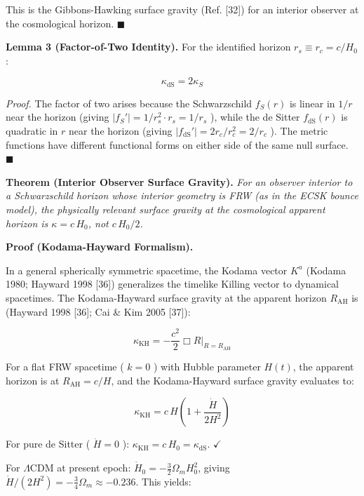 \documentclass[11pt,a4paper]{article}
\theoremstyle{definition}\newtheorem{definition}{Definition}
\theoremstyle{remark}\newtheorem{remark}{Remark}
\begin{document}
This is the Gibbons-Hawking surface gravity (Ref. [32]) for an interior observer at the cosmological horizon. $\blacksquare$

\textbf{Lemma 3 (Factor-of-Two Identity).} For the identified horizon $r_s \equiv r_c = c/H_0$:


\begin{equation}
\kappa_{\text{dS}} = 2 \kappa_S
\end{equation}


\textit{Proof.} The factor of two arises because the Schwarzschild $f_S(r)$ is linear in $1/r$ near the horizon (giving $|f_S'| = 1/r_s^2 \cdot r_s = 1/r_s$ ), while the de Sitter $f_{\text{dS}}(r)$ is quadratic in $r$ near the horizon (giving $|f_{\text{dS}}'| = 2r_c/r_c^2 = 2/r_c$ ). The metric functions have different functional forms on either side of the same null surface. $\blacksquare$

\textbf{Theorem (Interior Observer Surface Gravity).} \textit{For an observer interior to a Schwarzschild horizon whose interior geometry is FRW (as in the ECSK bounce model), the physically relevant surface gravity at the cosmological apparent horizon is $\kappa = c \, H_0$, not $c \, H_0/2$.}

\textbf{Proof (Kodama-Hayward Formalism).}

In a general spherically symmetric spacetime, the Kodama vector $K^a$ (Kodama 1980; Hayward 1998 [36]) generalizes the timelike Killing vector to dynamical spacetimes. The Kodama-Hayward surface gravity at the apparent horizon $R_{\text{AH}}$ is (Hayward 1998 [36]; Cai \& Kim 2005 [37]):


\begin{equation}
\kappa_{\text{KH}} = -\frac{c^2}{2} \Box R \big|_{R = R_{\text{AH}}}
\end{equation}


For a flat FRW spacetime ( $k = 0$ ) with Hubble parameter $H(t)$, the apparent horizon is at $R_{\text{AH}} = c/H$, and the Kodama-Hayward surface gravity evaluates to:


\begin{equation}
\kappa_{\text{KH}} = c \, H \left(1 + \frac{\dot{H}}{2H^2}\right)
\end{equation}


For pure de Sitter ( $\dot{H} = 0$ ): $\kappa_{\text{KH}} = c \, H_0 = \kappa_{\text{dS}}$. $\checkmark$

For $\Lambda$CDM at present epoch: $\dot{H}_0 = -\frac{3}{2} \Omega_m H_0^2$, giving $\dot{H}/(2H^2) = -\frac{3}{4}\Omega_m \approx -0.236$. This yields:
\end{document}
